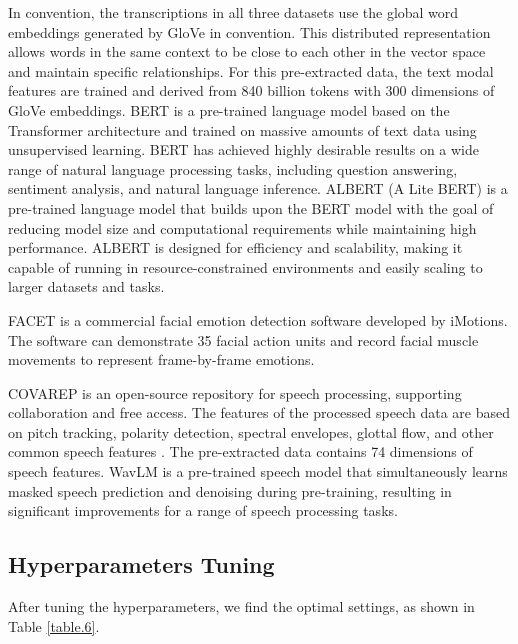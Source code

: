 \documentclass[11pt,a4paper]{article}
\begin{document}
 In convention, the transcriptions in all three datasets use the global word embeddings generated by GloVe in convention. This distributed representation allows words in the same context to be close to each other in the vector space and maintain specific relationships. For this pre-extracted data, the text modal features are trained and derived from 840 billion tokens with 300 dimensions of GloVe embeddings.  BERT is a pre-trained language model based on the Transformer architecture and trained on massive amounts of text data using unsupervised learning. BERT has achieved highly desirable results on a wide range of natural language processing tasks, including question answering, sentiment analysis, and natural language inference.  ALBERT (A Lite BERT) is a pre-trained language model that builds upon the BERT model with the goal of reducing model size and computational requirements while maintaining high performance. ALBERT is designed for efficiency and scalability, making it capable of running in resource-constrained environments and easily scaling to larger datasets and tasks.

 FACET is a commercial facial emotion detection software developed by iMotions. The software can demonstrate 35 facial action units and record facial muscle movements to represent frame-by-frame emotions.

 COVAREP is an open-source repository for speech processing, supporting collaboration and free access. The features of the processed speech data are based on pitch tracking, polarity detection, spectral envelopes, glottal flow, and other common speech features \citep{p56}. The pre-extracted data contains 74 dimensions of speech features.  WavLM is a pre-trained speech model that simultaneously learns masked speech prediction and denoising during pre-training, resulting in significant improvements for a range of speech processing tasks. 

\subsection{Hyperparameters Tuning}
After tuning the hyperparameters, we find the optimal settings, as shown in Table \ref{table.6}.
\end{document}
